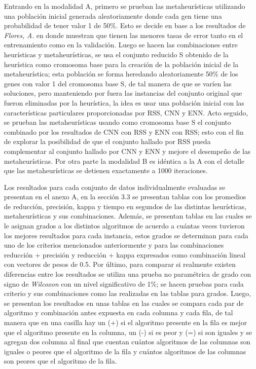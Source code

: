 Entrando en la modalidad A, primero se prueban las metaheurísticas utilizando una población inicial generada aleatoriamente donde cada gen tiene una probabilidad de tener valor 1 de 50\%. Esto se decide en base a los resultados de \emph{Flores, A.} en \cite{flores2014metaheuristics} donde muestran que tienen las menores tasas de error tanto en el entrenamiento como en la validación. Luego se hacen las combinaciones entre heurísticas y metaheurísticas, se usa el conjunto reducido S obtenido de la heurística como cromosoma base para la creación de la población inicial de la metaheurística; esta población se forma heredando aleatoriamente 50\% de los genes con valor 1 del cromosoma base S, de tal manera de que se varíen las soluciones, pero manteniendo por fuera las instancias del conjunto original que fueron eliminadas por la heurística, la idea es usar una población inicial con las características particulares proporcionadas por RSS, CNN y ENN. Acto seguido, se prueban las metaheurísticas usando como cromosoma base S el conjunto combinado por los resultados de CNN con RSS y ENN con RSS; esto con el fin de explorar la posibilidad de que el conjunto hallado por RSS pueda complementar al conjunto hallado por CNN y ENN y mejore el desempeño de las metaheurísticas. Por otra parte la modalidad B es idéntica a la A con el detalle que las metaheurísticas se detienen exactamente a 1000 iteraciones.

Los resultados para cada conjunto de datos individualmente evaluadas se presentan en el anexo A, en la sección 3.3 se presentan tablas con los promedios de reducción, precisión, kappa y tiempo en segundos de las distintas heurísticas, metaheurísticas y sus combinaciones. Además, se presentan tablas en las cuales se le asignan grados a los distintos algoritmos de acuerdo a cuántas veces tuvieron los mejores resultados para cada instancia, estos grados se determinan para cada uno de los criterios mencionados anteriormente y para las combinaciones reducción + precisión y reducción + kappa expresados como combinación lineal con vectores de pesos de 0.5. Por último, para comparar si realmente existen diferencias entre los resultados se utiliza una prueba no paramétrica de grado con signo de \emph{Wilcoxon} con un nivel significativo de 1\%; se hacen pruebas para cada criterio y sus combinaciones como las realizadas en las tablas para grados. Luego, se presentan los resultados en unas tablas en las cuales se compara cada par de algoritmo y combinación antes expuesta en cada columna y cada fila, de tal manera que en una casilla hay un (+) si el algoritmo presente en la fila es mejor que el algoritmo presente en la columna, un (-) si es peor y (=) si son iguales y se agregan dos columna al final que cuentan cuántos algoritmos de las columnas son iguales o peores que el algoritmo de la fila y cuántos algoritmos de las columnas son peores que el algoritmo de la fila.


